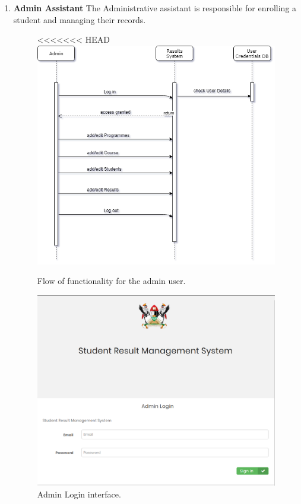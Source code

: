 \begin{enumerate}
\item \textbf{Admin Assistant}
The Administrative assistant is responsible for enrolling a student and managing their records.
\begin{figure}[H]
\caption{Flow of functionality for the admin user.}
<<<<<<< HEAD
\includegraphics[scale=0.4]{images/SequenceAdmin.png}
\end{figure}
\begin{figure}[H]
\caption{Admin Login interface.}
\includegraphics[scale=0.5]{images/admin_login.png}

\end{figure}
\end{enumerate}
